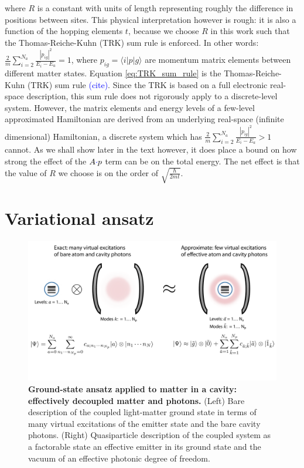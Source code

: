 \documentclass[aps,prb,twocolumn,
	groupedaddress,superscriptaddress,
	amsfonts,amssymb,amsmath,floatfix,
	citeautoscript]{revtex4-1}
\newcommand{\Jadd}[1]{\textcolor{blue}{#1}}
\begin{document}
where $R$ is a constant with units of length representing roughly the difference in positions between sites. This physical interpretation however is rough: it is also a function of the hopping elements $t$, because we choose $R$ in this work such that the Thomas-Reiche-Kuhn (TRK) sum rule is enforced. In other words: $\frac{2}{m}\sum\limits_{i=2}^{N_a}\frac{|p_{ig}|^2}{E_i - E_a} = 1$, where $p_{ig} = \langle i|p|g\rangle$ are momentum matrix elements between different matter states. Equation \ref{eq:TRK_sum_rule} is the Thomas-Reiche-Kuhn (TRK) sum rule \Jadd{(cite)}. Since the TRK is based on a full electronic real-space description, this sum rule does not rigorously apply to a discrete-level system. However, the matrix elements and energy levels of a few-level approximated Hamiltonian  are derived from an underlying real-space (infinite dimensional) Hamiltonian, a discrete system which has  $\frac{2}{m}\sum\limits_{i=2}^{N_a}\frac{|p_{ig}|^2}{E_i - E_a} > 1$ cannot. As we shall show later in the text however, it does place a bound on how strong the effect of the $A\Jadd{\cdot}p$ term can be on the total energy. The net effect is that the value of $R$ we choose is on the order of $\sqrt{\frac{\hbar}{2mt}}$.

\section{Variational ansatz}
\label{sec:variational_ansatz}
\begin{figure}[t]
\includegraphics[width=16cm]{conceptfigure.pdf}
\caption{\textbf{Ground-state ansatz applied to matter in a cavity: effectively decoupled matter and photons.} (Left) Bare description of the coupled light-matter ground state in terms of many virtual excitations of the emitter state and the bare cavity photons. (Right) Quasiparticle description of the coupled system as a factorable state an effective emitter in its ground state and the vacuum of an effective photonic degree of freedom.}
\label{fig:ansatz}
\end{figure}
\end{document}
